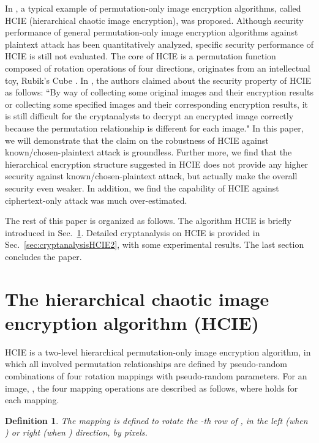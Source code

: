 \documentclass[final,3p,times,twocolumn]{elsarticle}
\newtheorem{definition}{Definition}
\begin{document}
In \cite{Yen-Guo:HCIE:IEEPVISP2000}, a typical example of permutation-only image encryption algorithms, called HCIE (hierarchical chaotic image encryption),
was proposed. Although security performance of general permutation-only image encryption algorithms against plaintext attack has been
quantitatively analyzed, specific security performance of HCIE is still not evaluated. The core of HCIE is a
permutation function composed of rotation operations of four directions, originates from an intellectual toy, Rubik's Cube \cite{Korf:Cube:97}.
In \cite{Yen-Guo:HCIE:IEEPVISP2000}, the authors claimed about the security property of HCIE as follows: ``By way of collecting some original images and their
encryption results or collecting some specified images and their corresponding encryption results, it is still difficult for
the cryptanalysts to decrypt an encrypted image correctly because the permutation relationship is different for each
image." In this paper, we will demonstrate that the claim on the robustness of HCIE against known/chosen-plaintext attack is groundless. Further more, we find that the hierarchical encryption structure suggested in HCIE does not provide any higher security against known/chosen-plaintext attack, but actually make
the overall security even weaker. In addition, we find the capability of HCIE against ciphertext-only attack was much over-estimated.

The rest of this paper is organized as follows. The algorithm HCIE is briefly introduced in Sec.~\ref{sec:HCIE}.
Detailed cryptanalysis on HCIE is provided in Sec.~\ref{sec:cryptanalysisHCIE2}, with some experimental results.
The last section concludes the paper.

\section{The hierarchical chaotic image encryption algorithm (HCIE)}
\label{sec:HCIE}

HCIE is a two-level hierarchical permutation-only image encryption algorithm, in which all involved permutation relationships are defined by pseudo-random
combinations of four rotation mappings with pseudo-random
parameters. For an image, , the four
mapping operations are described as follows, where 
holds for each mapping.

\begin{definition}
The mapping   is defined to
rotate the -th row of , in the left (when ) or right
(when ) direction, by  pixels.
\end{definition}
\end{document}
